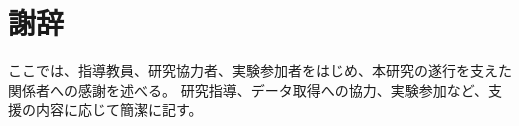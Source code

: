 \chapter*{謝辞}

ここでは、指導教員、研究協力者、実験参加者をはじめ、本研究の遂行を支えた関係者への感謝を述べる。 研究指導、データ取得への協力、実験参加など、支援の内容に応じて簡潔に記す。
